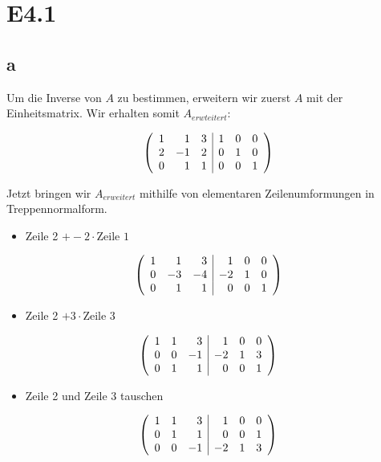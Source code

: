 \documentclass[12pt]{article}
\begin{document}
\section*{E4.1}
\subsection*{a}

Um die Inverse von $A$ zu bestimmen, erweitern wir zuerst $A$ mit der Einheitsmatrix. Wir erhalten somit $A_{erwteitert}$: 

$$
\left(
	\begin{array}{r r r | r r r}
		1	 &	 1	&	3	&	1	&	0	&	0	\\
		2	 &	-1	&	2	&	0	&	1	&	0	\\
		0	 &	 1	&	1	&	0	&	0	&	1	\\
	\end{array}
\right )
$$

Jetzt bringen wir $A_{erweitert}$ mithilfe von elementaren Zeilenumformungen in Treppennormalform.
\begin{itemize}
\item Zeile 2 $+ -2 \cdot \text{Zeile } 1$
\end{itemize}
$$
\left(
	\begin{array}{r r r | r r r}
		1	 &	 1	&	 3	&	 1	&	0	&	0	\\
		0	 &	-3	&	-4	&	-2	&	1	&	0	\\
		0	 &	 1	&	 1	&	 0	&	0	&	1	\\
	\end{array}
\right )
$$

\begin{itemize}
\item Zeile 2 $+ 3 \cdot \text{Zeile } 3$
\end{itemize}

$$
\left(
	\begin{array}{r r r | r r r}
		1	 &	 1	&	 3	&	 1	&	0	&	0	\\
		0	 &	 0	&	-1	&	-2	&	1	&	3	\\
		0	 &	 1	&	 1	&	 0	&	0	&	1	\\
	\end{array}
\right )
$$

\begin{itemize}
\item Zeile 2 und Zeile 3 tauschen
\end{itemize}
$$
\left(
	\begin{array}{r r r | r r r}
		1	 &	 1	&	 3	&	 1	&	0	&	0	\\
		0	 &	 1	&	 1	&	 0	&	0	&	1	\\
		0	 &	 0	&	-1	&	-2	&	1	&	3	\\
	\end{array}
\right )
$$
\end{document}
